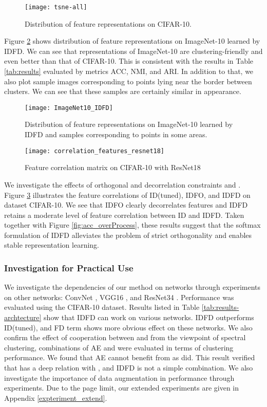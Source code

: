 \documentclass{article} \usepackage{iclr2021_conference,times}
\begin{document}
\begin{figure}[h]
  \centering
  \texttt{[image: tsne-all]}
  \caption{Distribution of feature representations on CIFAR-10.} 
  \label{fig:tsne_all}
\end{figure}

Figure \ref{fig:imagenet_tsne} shows distribution of feature representations on ImageNet-10 learned by IDFD. We can see that representations of ImageNet-10 are clustering-friendly and even better than that of CIFAR-10. This is consistent with the results in Table \ref{tab:results} evaluated by metrics ACC, NMI, and ARI. In addition to that, we also plot sample images corresponding to points lying near the border between clusters. We can see that these samples are certainly similar in appearance.

\begin{figure}[h] 
  \centering
  \texttt{[image: ImageNet10\_IDFD]}
  \caption{Distribution of feature representations on ImageNet-10 learned by IDFD and samples corresponding to points in some areas.}
  \label{fig:imagenet_tsne}
\end{figure}

\begin{figure}[h] 
  \centering
  \texttt{[image: correlation\_features\_resnet18]}
  \caption{Feature correlation matrix on CIFAR-10 with ResNet18}
  \label{fig:feature_corr_resnet18}
\end{figure}



We investigate the effects of orthogonal and decorrelation constraints  and .
Figure \ref{fig:feature_corr_resnet18} illustrates the feature correlations of ID(tuned), IDFO, and IDFD on dataset CIFAR-10.
We see that IDFO clearly decorrelates features and
IDFD retains a moderate level of feature correlation between ID and IDFD.
Taken together with Figure \ref{fig:acc_overProcess}, these results suggest that the softmax formulation of IDFD alleviates the problem of strict orthogonality and enables stable representation learning.

\subsubsection{Investigation for Practical Use}
\label{subsubsec:expented}
We investigate the dependencies of  our method on networks through experiments on other networks: ConvNet \cite{DCCM},
VGG16 \cite{VGG16}, and ResNet34 \cite{He2015}.  Performance was evaluated using the CIFAR-10 dataset. Results listed in Table \ref{tab:results-archtecture} show that IDFD can work on various networks. IDFD outperforms ID(tuned), and FD term shows more obvious effect on these networks. 
We also confirm the effect of cooperation between  and  from the viewpoint of spectral clustering,
combinations of AE and  were evaluated in terms of clustering performance. We found that AE cannot benefit from  as  did. 
This result verified that  has a deep relation with , and IDFD is not a simple combination.
We also investigate the importance of data augmentation in performance through experiments. Due to the page limit, our extended experiments are given in Appendix \ref{expteriment_extend}. 
\end{document}
